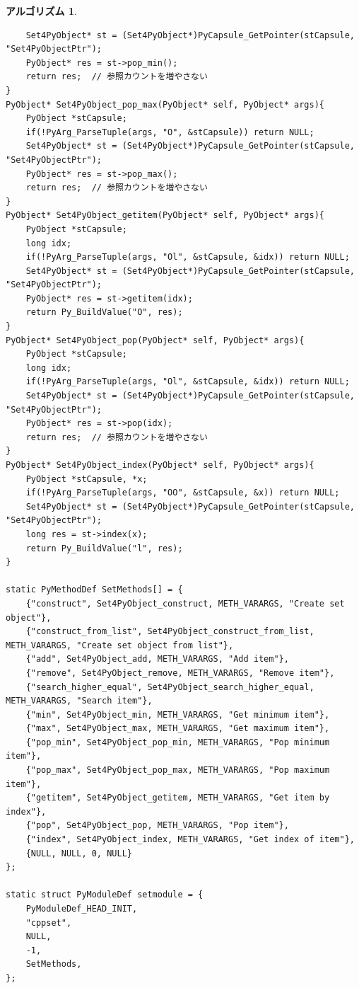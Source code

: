 \documentclass[12pt, a4j]{ltjsarticle}
\newtheorem{alg}[thm]{アルゴリズム}
\begin{document}
\begin{alg}
\begin{lstlisting}
    Set4PyObject* st = (Set4PyObject*)PyCapsule_GetPointer(stCapsule, "Set4PyObjectPtr");
    PyObject* res = st->pop_min();
    return res;  // 参照カウントを増やさない
}
PyObject* Set4PyObject_pop_max(PyObject* self, PyObject* args){
    PyObject *stCapsule;
    if(!PyArg_ParseTuple(args, "O", &stCapsule)) return NULL;
    Set4PyObject* st = (Set4PyObject*)PyCapsule_GetPointer(stCapsule, "Set4PyObjectPtr");
    PyObject* res = st->pop_max();
    return res;  // 参照カウントを増やさない
}
PyObject* Set4PyObject_getitem(PyObject* self, PyObject* args){
    PyObject *stCapsule;
    long idx;
    if(!PyArg_ParseTuple(args, "Ol", &stCapsule, &idx)) return NULL;
    Set4PyObject* st = (Set4PyObject*)PyCapsule_GetPointer(stCapsule, "Set4PyObjectPtr");
    PyObject* res = st->getitem(idx);
    return Py_BuildValue("O", res);
}
PyObject* Set4PyObject_pop(PyObject* self, PyObject* args){
    PyObject *stCapsule;
    long idx;
    if(!PyArg_ParseTuple(args, "Ol", &stCapsule, &idx)) return NULL;
    Set4PyObject* st = (Set4PyObject*)PyCapsule_GetPointer(stCapsule, "Set4PyObjectPtr");
    PyObject* res = st->pop(idx);
    return res;  // 参照カウントを増やさない
}
PyObject* Set4PyObject_index(PyObject* self, PyObject* args){
    PyObject *stCapsule, *x;
    if(!PyArg_ParseTuple(args, "OO", &stCapsule, &x)) return NULL;
    Set4PyObject* st = (Set4PyObject*)PyCapsule_GetPointer(stCapsule, "Set4PyObjectPtr");
    long res = st->index(x);
    return Py_BuildValue("l", res);
}

static PyMethodDef SetMethods[] = {
    {"construct", Set4PyObject_construct, METH_VARARGS, "Create set object"},
    {"construct_from_list", Set4PyObject_construct_from_list, METH_VARARGS, "Create set object from list"},
    {"add", Set4PyObject_add, METH_VARARGS, "Add item"},
    {"remove", Set4PyObject_remove, METH_VARARGS, "Remove item"},
    {"search_higher_equal", Set4PyObject_search_higher_equal, METH_VARARGS, "Search item"},
    {"min", Set4PyObject_min, METH_VARARGS, "Get minimum item"},
    {"max", Set4PyObject_max, METH_VARARGS, "Get maximum item"},
    {"pop_min", Set4PyObject_pop_min, METH_VARARGS, "Pop minimum item"},
    {"pop_max", Set4PyObject_pop_max, METH_VARARGS, "Pop maximum item"},
    {"getitem", Set4PyObject_getitem, METH_VARARGS, "Get item by index"},
    {"pop", Set4PyObject_pop, METH_VARARGS, "Pop item"},
    {"index", Set4PyObject_index, METH_VARARGS, "Get index of item"},
    {NULL, NULL, 0, NULL}
};

static struct PyModuleDef setmodule = {
    PyModuleDef_HEAD_INIT,
    "cppset",
    NULL,
    -1,
    SetMethods,
};


\end{lstlisting}
\end{alg}
\end{document}
